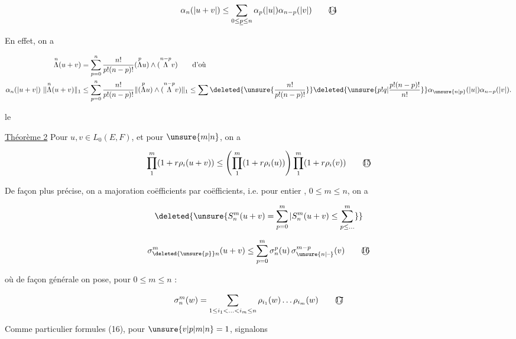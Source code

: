 \[
\alpha_n(|u+v|)\leq\sum_{0\leq\underline{p}\leq n}\alpha_p(|u|)\alpha_{n-p}(|v|)\tag*{\textcircled{14}}
\]

En effet, on a  

\[
\begin{aligned}
\overset{n}{\Lambda}(u+v)&=\sum_{p=0}^n\frac{n!}{p!(n-p)!}(\overset{p}{\Lambda}u)\wedge(\overset{n-p}{\Lambda}v)\qquad\text{d'où}\\
\alpha_n(|u+v|)\ \lVert\overset{n}{\Lambda}(u+v)\rVert_1
&\leq\sum_{p=0}^n\frac{n!}{p!(n-p)!}\lVert(\overset{p}{\Lambda}u)\wedge(\overset{n-p}{\Lambda}v)\rVert_1\leq\sum\deleted{\unsure{\frac{n!}{p!(n-p)!}}}\deleted{\unsure{p!q|\frac{p!(n-p)!}{n!}}}\alpha_{\unsure{n|p}}(|u|)\alpha_{n-p}(|v|).
\end{aligned}
\]

 le

\uline{Théorème 2} Pour $u,v\in L_0(E,F)$,  et pour  $\unsure{m|n}$, on a

\[
\prod_1^m(1+r\rho_i(u+v))\leq\left(\prod_1^m(1+r\rho_i(u))\right)\prod_1^m(1+r\rho_i(v))\tag*{\textcircled{15}}
\]

De façon plus précise, on a majoration coëfficients par coëfficients, i.e. pour  entier  , $0\leq m\leq n$, on a

\[
\deleted{\unsure{S_n^m(u+v)=\sum_{p=0}^{m}|S_n^m(u+v)\leq\sum_{p\leq\ldots}^{m}}}
\]

\[
\sigma_{\deleted{\unsure{p}}n}^{m}(u+v)\leq\sum_{p=0}^m\sigma_n^p(u)\,\sigma_{\unsure{n|\text{--}}}^{m-p}(v)\tag*{\textcircled{16}}
\]


où de façon générale on pose, pour  $0\leq m\leq n$ :

\[
\sigma_n^m(w)=\sum_{1\leq i_1<\ldots<i_m\leq n}\rho_{i_1}(w)\ldots\rho_{i_m}(w)\tag*{\textcircled{17}}
\]

Comme  particulier  formules (16), pour $\unsure{v|p|m|n}=1$, signalons 
